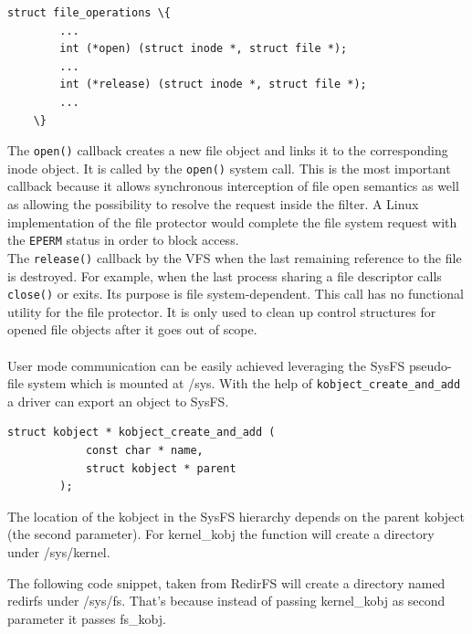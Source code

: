 	\begin{Verbatim}[fontsize=\small, commandchars=\\\{\}]
	struct file_operations \{ 
		...
		int (*open) (struct inode *, struct file *); 
		...
		int (*release) (struct inode *, struct file *); 
		...
	\}	
	\end{Verbatim}
	
	The \texttt{open()} callback creates a new file object and links it to the corresponding inode object. It is called by the \texttt{open()} system call\cite{LinuxKernelDevelopment}. This is the most important callback because it allows synchronous interception of file open semantics as well as allowing the possibility to resolve the request inside the filter. A Linux implementation of the file protector would complete the file system request with the \texttt{EPERM} status in order to block access.\\ 
	
	The \texttt{release()} callback by the VFS when the last remaining reference to the file is destroyed. For example, when the last process sharing a file descriptor calls \texttt{close()} or exits. Its purpose is file system-dependent\cite{LinuxKernelDevelopment}. This call has no functional utility for the file protector. It is only used to clean up control structures for opened file objects after it goes out of scope. 
	
	\paragraph{} 
	User mode communication can be easily achieved leveraging the SysFS pseudo-file system which is mounted at /sys. With the help of \texttt{kobject\_create\_and\_add} a driver can export an object to SysFS. \\
	
	\begin{Verbatim}[fontsize=\small, commandchars=\\\{\}]
struct kobject * kobject_create_and_add (
			const char * name, 
			struct kobject * parent
		);
	\end{Verbatim}
	
	The location of the kobject in the SysFS hierarchy depends on the parent kobject (the second parameter). For kernel\_kobj the function will create a directory under /sys/kernel. 
	
	The following code snippet, taken from RedirFS will create a directory named redirfs under /sys/fs. That's because instead of passing kernel\_kobj as second parameter it passes fs\_kobj. 
	

